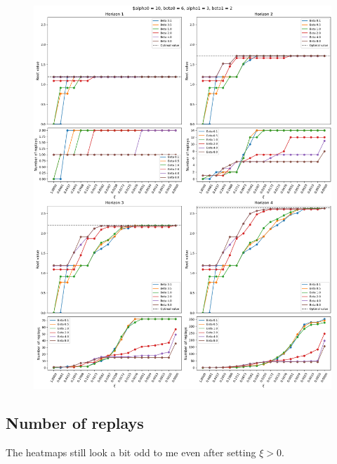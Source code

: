 \documentclass{article}
\begin{document}
\begin{figure}[ht!]
    \centering
    \includegraphics[width=1\textwidth]{../data/convergence/xi/alpha010_beta06_alpha13_beta12_complete.png}
\end{figure}

\clearpage

\subsection*{Number of replays}

The heatmaps still look a bit odd to me even after setting $\xi > 0$.

\end{document}
